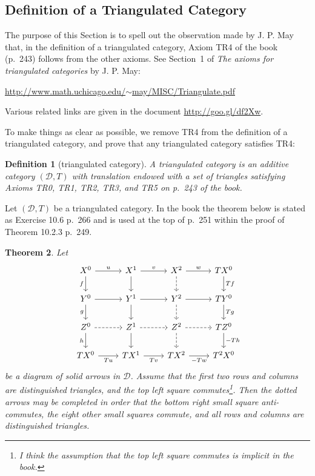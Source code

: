 \documentclass[12pt]{article}
\newtheorem{thm}{Theorem}
\newtheorem{df}[thm]{Definition}
\theoremstyle{remark}
\theoremstyle{definition}
\newcommand{\cc}{\mathcal}
\begin{document}
\subsection{Definition of a Triangulated Category}

The purpose of this Section is to spell out the observation made by J. P. May that, in the definition of a triangulated category, Axiom TR4 of the book (p.~243) follows from the other axioms. See Section~1 of {\em The axioms for triangulated categories} by J. P. May:  
%
\begin{center}\href{http://www.math.uchicago.edu/~may/MISC/Triangulate.pdf}{http://www.math.uchicago.edu/$\sim$may/MISC/Triangulate.pdf} 
\end{center}
%
Various related links are given in the document \href{http://goo.gl/df2Xw}{http://goo.gl/df2Xw}. 

To make things as clear as possible, we remove TR4 from the definition of a triangulated category, and prove that any triangulated category satisfies TR4:

\begin{df}[triangulated category]\label{tr} 
A {\em triangulated category} is an additive category $(\cc D,T)$ with translation endowed with a set of triangles satisfying Axioms {\em TR0, TR1, TR2, TR3}, and {\em TR5} on p.~243 of the book.
\end{df}

Let $(\cc D,T)$ be a triangulated category. In the book the theorem below is stated as Exercise 10.6 p.~266 and is used at the top of p.~251 within the proof of Theorem 10.2.3 p.~249.

\begin{thm}\label{mayt}
Let 
$$
\begin{tikzcd}
X^0\ar{r}{u}\ar{d}[swap]{f}&X^1\ar{d}\ar{r}{v}&X^2\ar[dashed]{d}\ar{r}{w}&TX^0\ar{d}{Tf}\\ 
Y^0\ar{r}\ar{d}[swap]{g}&Y^1\ar{d}\ar{r}&Y^2\ar[dashed]{d}\ar{r}&TY^0\ar{d}{Tg}\\ 
Z^0\ar[dashed]{r}\ar{d}[swap]{h}&Z^1\ar{d}\ar[dashed]{r}&Z^2\ar[dashed]{d}\ar[dashed]{r}&TZ^0\ar{d}{-Th}\\ 
TX^0\ar{r}[swap]{Tu}&TX^1\ar{r}[swap]{Tv}&TX^2\ar{r}[swap]{-Tw}&T^2X^0 
\end{tikzcd}
$$ 
be a diagram of solid arrows in $\cc D$. Assume that the first two rows and columns are distinguished triangles, and the top left square commutes\footnote{I think the assumption that the top left square commutes is implicit in the book.}. Then the dotted arrows may be completed in order that the bottom right small square anti-commutes, the eight other small squares commute, and all rows and columns are distinguished triangles. 
\end{thm}
\end{document}
